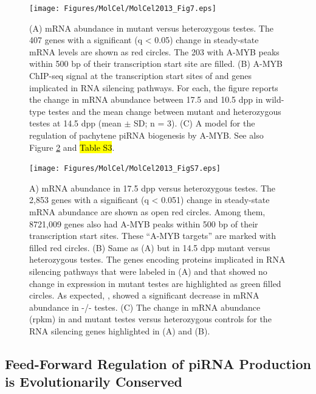     \begin{figure}[htbp] %
      \centering
      \texttt{[image: Figures/MolCel/MolCel2013\_Fig7.eps]}
      \caption[A-MYB Regulates Expression of mRNAs Encoding piRNA Pathway Proteins]
      {
      	(A) mRNA abundance in \amyb{} mutant versus heterozygous testes. The 407 genes with a significant (q < 0.05) change in steady-state mRNA levels are shown as red circles. The 203 with A-MYB peaks within 500 bp of their transcription start site are filled.
      	(B) A-MYB ChIP-seq signal at the transcription start sites of \amyb{} and genes implicated in RNA silencing pathways. For each, the figure reports the change in mRNA abundance between 17.5 and 10.5 dpp in wild-type testes and the mean change between \amyb{} mutant and heterozygous testes at 14.5 dpp (mean $\pm$ SD; n = 3).
      	(C) A model for the regulation of pachytene piRNA biogenesis by A-MYB. See also Figure \ref{fig:MolCelS7} and \hl{Table S3}.
      	}
      \label{fig:MolCelF7}
    	\end{figure}
    \begin{figure}[htbp] %
      \centering 
      \texttt{[image: Figures/MolCel/MolCel2013\_FigS7.eps]}
      \caption[\amyb{} mutants, but Not \miwi{} Mutants, Change the Expression of RNA Silencing Pathway Genes]
      {
      	A) mRNA abundance in 17.5 dpp \amyb{} versus heterozygous testes. The 2,853 genes with a significant (q < 0.051) change in steady-state mRNA abundance are shown as open red circles. Among them, 8721,009 genes also had A-MYB peaks within 500 bp of their transcription start sites. These “A-MYB targets” are marked with filled red circles. (B) Same as (A) but in 14.5 dpp \miwi{} mutant versus heterozygous testes. The genes encoding proteins implicated in RNA silencing pathways that were labeled in (A) and that showed no change in expression in \miwi{} mutant testes are highlighted as green filled circles. As expected, \miwi{}, showed a significant decrease in mRNA abundance in \miwi{}-/- testes. (C) The change in mRNA abundance (rpkm) in \amyb{} and \miwi{} mutant testes versus heterozygous controls for the RNA silencing genes highlighted in (A) and (B).
      	}
      \label{fig:MolCelS7}
    	\end{figure}

  \subsection{Feed-Forward Regulation of piRNA Production is Evolutionarily Conserved}

